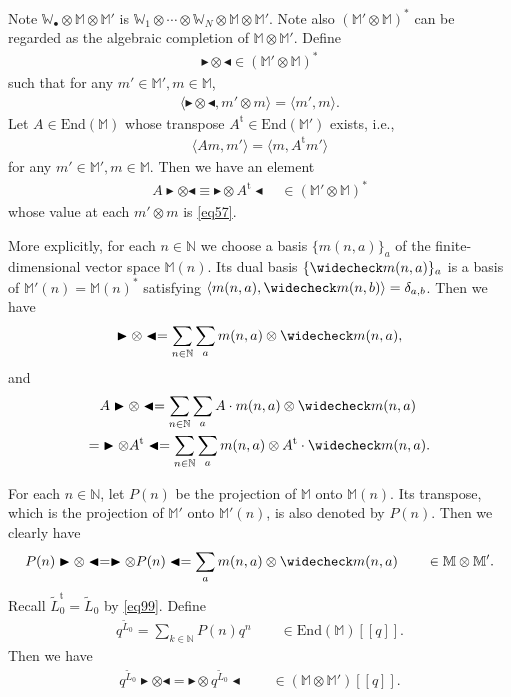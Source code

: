 \documentclass[12pt,a4paper,notitlepage]{article}
\theoremstyle{definition}
\theoremstyle{plain}
\newcommand{\wtd}{\widetilde}
\newcommand{\wch}{\widecheck}
\newcommand{\tr}{\mathrm{t}} %
\newcommand{\End}{\mathrm{End}} %
\newcommand{\bk}[1]{\langle {#1}\rangle}
\newcommand{\blt}{\bullet}
\newcommand{\Wbb}{\mathbb W}
\newcommand{\Mbb}{\mathbb M}
\newcommand{\Nbb}{\mathbb N}
\newcommand{\btl}{\blacktriangleleft}
\newcommand{\btr}{\blacktriangleright}
\numberwithin{equation}{section}
\begin{document}
Note $\Wbb_\blt\otimes\Mbb\otimes\Mbb'$ is $\Wbb_1\otimes\cdots\otimes \Wbb_N\otimes\Mbb\otimes\Mbb'$. Note also $(\Mbb'\otimes\Mbb)^*$ can be regarded as the algebraic completion of $\Mbb\otimes\Mbb'$.  Define \index{zzz@$\btr\otimes\btl$}
\begin{align*}
\btr\otimes\btl\in (\Mbb'\otimes\Mbb)^*
\end{align*}
such that for any $m'\in\Mbb',m\in\Mbb$,
\begin{align}
\bk{\btr\otimes\btl,m'\otimes m}=\bk{m',m}.\label{eq95}
\end{align}
Let $A\in\End(\Mbb)$ whose transpose $A^\tr\in\End(\Mbb')$ exists, i.e.,
\begin{align}
\bk{Am,m'}=\bk{m,A^\tr m'}\label{eq57}
\end{align}
for any $m'\in\Mbb',m\in\Mbb$. Then we have an element
\begin{align}
A\btr\otimes\btl\equiv \btr\otimes A^\tr\btl\quad\in (\Mbb'\otimes\Mbb)^*\label{eq58}
\end{align}
whose value at each $m'\otimes m$ is \eqref{eq57}.


More explicitly, for each $n\in\Nbb$ we choose a basis $\{m(n,a)\}_a$ of the finite-dimensional vector space $\Mbb(n)$. Its dual basis $\{\wch m(n,a)\}_a$ is a basis of $\Mbb'(n)=\Mbb(n)^*$ satisfying $\bk{m(n,a),\wch m(n,b)}=\delta_{a,b}$. Then we have
\begin{gather*}
\btr\otimes\btl=\sum_{n\in\Nbb}\sum_am(n,a)\otimes\wch m(n,a),
\end{gather*}
and
\begin{align*}
&A\btr\otimes\btl=\sum_{n\in\Nbb}\sum_a A\cdot m(n,a)\otimes\wch m(n,a)\\
=& \btr\otimes A^\tr\btl=\sum_{n\in\Nbb}\sum_am(n,a)\otimes A^\tr\cdot \wch m(n,a).
\end{align*}

For each $n\in\Nbb$, let $P(n)$ be the projection of $\Mbb$ onto $\Mbb(n)$.  Its transpose, which is the projection of $\Mbb'$ onto $\Mbb'(n)$, is also denoted by $P(n)$. Then we clearly have
\begin{align*}
P(n)\btr\otimes\btl=\btr\otimes P(n)\btl=\sum_am(n,a)\otimes\wch m(n,a)\qquad\in\Mbb\otimes\Mbb'.
\end{align*}
Recall $\wtd L_0^\tr=\wtd L_0$ by \eqref{eq99}. Define
\begin{align*}
q^{\wtd L_0}=\sum_{k\in\Nbb}P(n)q^n\qquad\in\End(\Mbb)[[q]].
\end{align*} 
Then we have
\begin{align}
q^{\wtd L_0}\btr\otimes\btl=\btr\otimes q^{\wtd L_0} \btl\qquad \in (\Mbb\otimes\Mbb')[[q]].\label{eq59}
\end{align}
\end{document}
